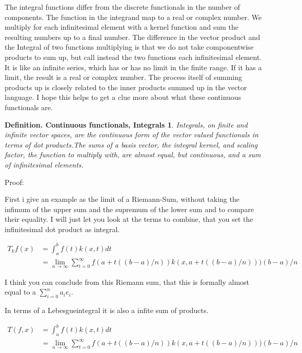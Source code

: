 \documentclass[a4paper]{article}
\begin{document}
The integral functions differ from the discrete functionals in the number of components. The function in the integrand map to a real or complex number. We multiply for each infinitesimal element with a kernel function and sum the resulting numbers up to a final number. The difference in the vector product and the Integral of two functions multiplying is that we do not take componentwise products to sum up, but call instead the two functions each infinitesimal element. It is like an infinite series, which has or has no limit in the finite range. If it has a limit, the result is a real or complex number. The process itself of summing products up is closely related to the inner products summed up in the vector language. I hope this helps to get a clue more about what these continuous functionals are.

\newtheorem{cont_func}{Definition. Continuous functionals, Integrals}
\begin{cont_func}
Integrals, on finite and infinite vector spaces, are the continuous form of the vector valued functionals in terms of dot products.The sums of a basis vector, the integral kernel, and scaling factor, the function to multiply with, are almost equal, but continuous, and a sum of infinitesimal elements.
\end{cont_func}

Proof:

First i give an example as the limit of a Riemann-Sum, without taking the infimum of the upper sum and the supremum of the lower sum and to compare their equality. I will just let you look at the terms to combine, that you set the infinitesimal dot product as integral.

\begin{displaymath}
\begin{align}
	T_{k}f(x) &= \int_{a}^{b}f(t)k(x,t)dt\\
	&= \lim_{n \rightarrow \infty} \sum_{t=0}^{\infty} f(a + t((b-a)/n)) k(x, a+t((b-a)/n))) (b-a)/n
\end{align}
\end{displaymath}

I think you can conclude from this Riemann sum, that this is formally almost equal to a $\sum_{i=0}^{n} a_i e_i$. 


In terms of a Lebesgueintegral it is also a infite sum of products.

\begin{displaymath}
\begin{align}
	T(f, x) &= \int_{a}^{b}f(t)k(x,t)dt\\
	&= \lim_{n \rightarrow \infty} \sum_{t=0}^{\infty} f(a + t((b-a)/n)) k(x, a+t((b-a)/n))) (b-a)/n
\end{align}
\end{displaymath}
\end{document}
